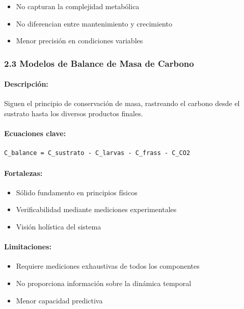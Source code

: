 \documentclass[
]{article}
\providecommand{\tightlist}{%
  \setlength{\itemsep}{0pt}\setlength{\parskip}{0pt}}
\begin{document}
\begin{itemize}
\tightlist
\item
  No capturan la complejidad metabólica
\item
  No diferencian entre mantenimiento y crecimiento
\item
  Menor precisión en condiciones variables
\end{itemize}

\subsubsection{2.3 Modelos de Balance de Masa de
Carbono}\label{modelos-de-balance-de-masa-de-carbono}

\paragraph{Descripción:}\label{descripciuxf3n-2}

Siguen el principio de conservación de masa, rastreando el carbono desde
el sustrato hasta los diversos productos finales.

\paragraph{Ecuaciones clave:}\label{ecuaciones-clave-2}

\begin{verbatim}
C_balance = C_sustrato - C_larvas - C_frass - C_CO2
\end{verbatim}

\paragraph{Fortalezas:}\label{fortalezas-2}

\begin{itemize}
\tightlist
\item
  Sólido fundamento en principios físicos
\item
  Verificabilidad mediante mediciones experimentales
\item
  Visión holística del sistema
\end{itemize}

\paragraph{Limitaciones:}\label{limitaciones-2}

\begin{itemize}
\tightlist
\item
  Requiere mediciones exhaustivas de todos los componentes
\item
  No proporciona información sobre la dinámica temporal
\item
  Menor capacidad predictiva
\end{itemize}
\end{document}
